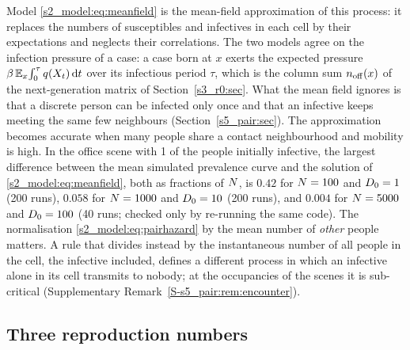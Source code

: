 Model \eqref{s2_model:eq:meanfield} is the mean-field approximation of this process: it replaces the numbers
of susceptibles and infectives in each cell by their expectations and neglects their correlations. The two
models agree on the infection pressure of a case: a case born at $x$ exerts the expected pressure
$\beta\,\mathbb{E}_x\!\int_0^\tau q(X_t)\,\mathrm{d} t$ over its infectious period $\tau$, which is the column sum
$n_{\mathrm{off}}(x)$ of the next-generation matrix of Section~\ref{s3_r0:sec}. What the mean field ignores is that a
discrete person can be infected only once and that an infective keeps meeting the same few neighbours
(Section~\ref{s5_pair:sec}). The approximation becomes accurate when many people share a contact
neighbourhood and mobility is high. In the office scene with 1\pct{} of the people initially infective, the
largest difference between the mean simulated prevalence curve and the solution of
\eqref{s2_model:eq:meanfield}, both as fractions of $N$, is $0.42$ for $N=100$ and $D_0=1$ (200 runs),
$0.058$ for $N=1000$ and $D_0=10$ (200 runs), and $0.004$ for $N=5000$ and $D_0=100$ (40 runs; checked
only by re-running the same code).
The normalisation \eqref{s2_model:eq:pairhazard} by the mean number of \emph{other} people matters. A rule that
divides instead by the instantaneous number of all people in the cell, the infective included, defines a
different process in which an infective alone in its cell transmits to nobody; at the occupancies of the
scenes it is sub-critical (Supplementary Remark~\ref{S-s5_pair:rem:encounter}).

\subsection{Three reproduction numbers}\label{s2_model:sec:numbers}

